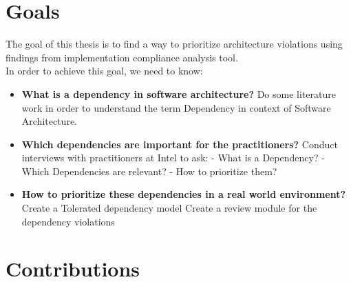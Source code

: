 \section{Goals}
The goal of this thesis is to find a way to prioritize architecture violations using findings from implementation compliance analysis tool. \\In order to achieve this goal, we need to know:

\begin{itemize}
	\item \textbf{What is a dependency in software architecture?}\newline
				Do some literature work in order to understand the term Dependency in context of Software Architecture.
	\item \textbf{Which dependencies are important for the practitioners?} \newline
				Conduct interviews with practitioners at Intel to ask: \newline
				- What is a Dependency? \newline
				- Which Dependencies are relevant? \newline
				- How to prioritize them?	 
	\item \textbf{How to prioritize these dependencies in a real world environment?} \newline
				Create a Tolerated dependency model
				Create a review module for the dependency violations		
\end{itemize}

\section{Contributions}\label{contributions}